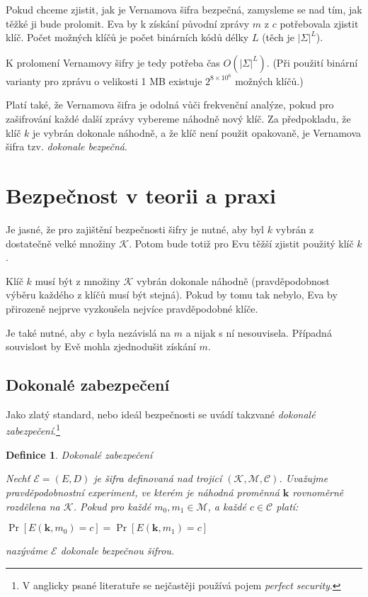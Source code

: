 \documentclass[12pt]{article}
\newtheorem{definition}{Definice}[section]
\begin{document}
        Pokud chceme zjistit, jak je Vernamova šifra bezpečná, zamysleme se nad tím, jak těžké ji bude prolomit.
        Eva by k získání původní zprávy $m$ z $c$ potřebovala zjistit klíč. Počet možných klíčů je počet binárních kódů délky $L$ (těch je $|\Sigma|^L$).

        K prolomení Vernamovy šifry je tedy potřeba čas $O(|\Sigma|^L)$. (Při použití binární varianty pro zprávu o velikosti 1 MB existuje $2^{8 \times 10^6}$ možných klíčů.)
        
        Platí také, že Vernamova šifra je odolná vůči frekvenční analýze, pokud pro zašifrování každé další zprávy vybereme náhodně nový klíč.
        Za předpokladu, že klíč $k$ je vybrán dokonale náhodně, a že klíč není použit opakovaně, je Vernamova šifra tzv.
        \emph{dokonale bezpečná}.


\section{Bezpečnost v teorii a praxi}
    
    Je jasné, že pro zajištění bezpečnosti šifry je nutné, aby byl $k$ vybrán z dostatečně velké množiny $\mathcal{K}$.
    Potom bude totiž pro Evu těžší zjistit použitý klíč $k$.

    Klíč $k$ musí být z množiny $\mathcal{K}$ vybrán dokonale náhodně (pravděpodobnost výběru každého z klíčů musí být stejná).
    Pokud by tomu tak nebylo, Eva by přirozeně nejprve vyzkoušela nejvíce pravděpodobné klíče.

    Je také nutné, aby $c$ byla nezávislá na $m$ a nijak s ní nesouvisela. Případná souvislost by Evě mohla zjednodušit získání $m$.

    \subsection*{Dokonalé zabezpečení}
    Jako zlatý standard, nebo ideál bezpečnosti se uvádí takzvané \emph{dokonalé zabezpečení}.\footnote{V anglicky psané
    literatuře se nejčastěji používá pojem \emph{perfect security}.}


    \begin{definition}
        Dokonalé zabezpečení

        Nechť $\mathcal{E}=(E, D)$ je šifra definovaná nad trojicí $(\mathcal{K},\mathcal{M},\mathcal{C})$.
        Uvažujme pravděpodobnostní experiment, ve kterém je náhodná proměnná $\textbf{k}$ rovnoměrně rozdělena na $\mathcal{K}$.
        Pokud pro každé $m_0, m_1 \in \mathcal{M}$, a každé $c \in \mathcal{C}$ platí:

        \medskip
        $\Pr[E(\textbf{k},m_0) = c] = \Pr[E(\textbf{k},m_1) = c]$

        \medskip
        nazýváme $\mathcal{E}$ dokonale bezpečnou šifrou.
    \end{definition}
\end{document}
